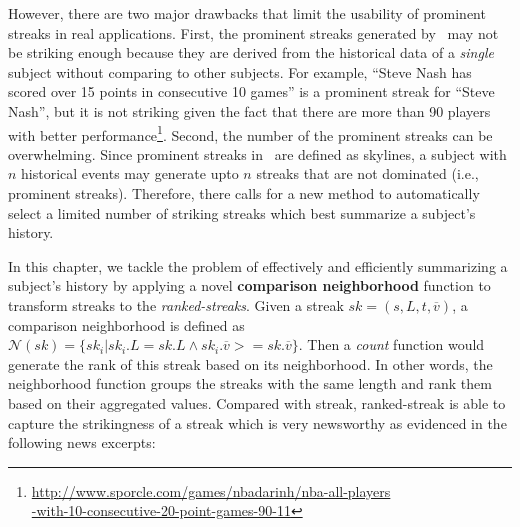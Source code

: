 %
However, there are two major drawbacks that limit the usability
of prominent streaks in real applications.
First, the prominent streaks generated by~\cite{zhang2014discovering} may not be striking enough because they are derived from the historical data of a \emph{single} subject without comparing to other subjects.
For example, 
``Steve Nash has scored over 15 points in consecutive 10 games'' is a prominent streak for ``Steve Nash'', but it is not striking given the fact that there are more than 90 players with better performance\footnote{\url{http://www.sporcle.com/games/nbadarinh/nba-all-players} \\ \url{-with-10-consecutive-20-point-games-90-11}}. 
Second, the number of the prominent streaks can be overwhelming. 
Since prominent streaks in~\cite{zhang2014discovering} are defined as skylines,
a subject with $n$ historical events may generate upto $n$ streaks that are not dominated (i.e., prominent streaks).
Therefore, there calls for a new method to automatically select a limited number of striking streaks which best summarize a subject's history.

In this chapter, we tackle the problem of effectively and efficiently 
summarizing a subject's history by
applying a novel \textbf{comparison neighborhood} function to transform streaks to the \emph{ranked-streaks}. 
Given a streak $sk=(s,L,t,\overline{v})$, a comparison neighborhood is defined as $\mathcal{N}(sk) = \{sk_i | sk_i.L = sk.L \wedge sk_i.\overline{v} >= sk.\overline{v}\}$. Then a \emph{count} function 
would generate the rank of this streak based on its neighborhood. In other words, the neighborhood function groups 
the streaks with the same length and rank them based on their aggregated values. Compared with streak, ranked-streak is able to capture the strikingness of a streak 
which is very newsworthy as evidenced in the following news excerpts:

